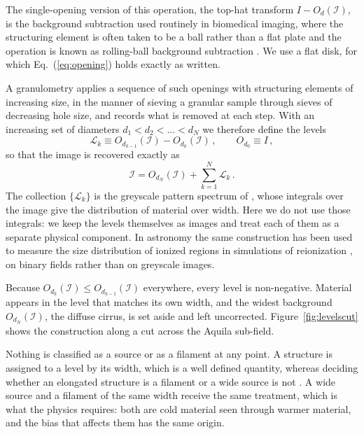 \documentclass{aa}
\newcommand{\Iim}{\mathcal{I}}
\begin{document}
The single-opening version of this operation, the top-hat transform
$I - O_d(\Iim)$, is the background subtraction used routinely in biomedical
imaging, where the structuring element is often taken to be a ball rather than
a flat plate and the operation is known as rolling-ball background subtraction
\citep{Sternberg1983}. We use a flat disk, for which
Eq.~(\ref{eq:opening}) holds exactly as written.

A granulometry applies a sequence of such openings with structuring elements of
increasing size, in the manner of sieving a granular sample through sieves of
decreasing hole size, and records what is removed at each step. With an
increasing set of diameters $d_1 < d_2 < \ldots < d_N$ we therefore define the
levels
%
\begin{equation}
   \mathcal{L}_k \equiv O_{d_{k-1}}(\Iim) - O_{d_k}(\Iim)\,,
   \qquad O_{d_0} \equiv I \,,
   \label{eq:levels}
\end{equation}
%
so that the image is recovered exactly as
%
\begin{equation}
   \Iim = O_{d_N}(\Iim) + \sum_{k=1}^{N} \mathcal{L}_k \,.
   \label{eq:sum}
\end{equation}
%
The collection $\{\mathcal{L}_k\}$ is the greyscale pattern spectrum of
\citet{Maragos1989}, whose integrals over the image give the distribution of
material over width. Here we do not use those integrals: we keep the levels
themselves as images and treat each of them as a separate physical component.
In astronomy the same construction has been used to measure the size
distribution of ionized regions in simulations of reionization
\citep{Kakiichi+2017}, on binary fields rather than on greyscale images.

Because $O_{d_k}(\Iim) \le O_{d_{k-1}}(\Iim)$ everywhere, every level is
non-negative. Material appears in the level that matches its own width, and the
widest background $O_{d_N}(\Iim)$, the diffuse cirrus, is set aside and left
uncorrected. Figure~\ref{fig:levelscut} shows the construction along a cut
across the Aquila sub-field.

Nothing is classified as a source or as a filament at any point. A structure is
assigned to a level by its width, which is a well defined quantity, whereas
deciding whether an elongated structure is a filament or a wide source is not
\citep{Menshchikov2021}. A wide source and a filament of the same width
receive the same treatment, which is what the physics requires: both are cold
material seen through warmer material, and the bias that affects them has the
same origin.
\end{document}
